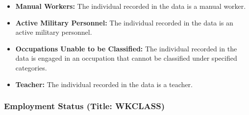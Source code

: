 \documentclass[twocolumn]{article}
\begin{document}
\begin{itemize}
    \item \textbf{Manual Workers:} The individual recorded in the data is a manual worker.
    \item \textbf{Active Military Personnel:} The individual recorded in the data is an active military personnel.
    \item \textbf{Occupations Unable to be Classified:} The individual recorded in the data is engaged in an occupation that cannot be classified under specified categories.
    \item \textbf{Teacher:} The individual recorded in the data is a teacher.
\end{itemize}

	\subsubsection{Employment Status (Title: WKCLASS)}
\end{document}

